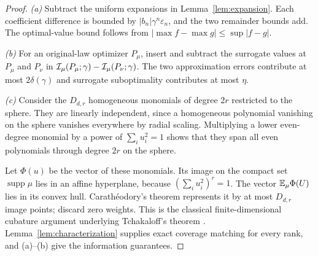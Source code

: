 \begin{proof}
\emph{(a)} Subtract the uniform expansions in Lemma~\ref{lem:expansion}. Each coefficient difference is bounded by $|b_n|\gamma^n\varepsilon_n$, and the two remainder bounds add. The optimal-value bound follows from $|\max f-\max g|\le\sup|f-g|$.

\emph{(b)} For an original-law optimizer $P_\mu$, insert and subtract the surrogate values at $P_\mu$ and $P_\nu$ in $\mathcal I_\mu(P_\mu;\gamma)-\mathcal I_\mu(P_\nu;\gamma)$. The two approximation errors contribute at most $2\delta(\gamma)$ and surrogate suboptimality contributes at most $\eta$.

\emph{(c)} Consider the $D_{d,r}$ homogeneous monomials of degree $2r$ restricted to the sphere. They are linearly independent, since a homogeneous polynomial vanishing on the sphere vanishes everywhere by radial scaling. Multiplying a lower even-degree monomial by a power of $\sum_i u_i^2=1$ shows that they span all even polynomials through degree $2r$ on the sphere.

Let $\Phi(u)$ be the vector of these monomials. Its image on the compact set $\operatorname{supp}\mu$ lies in an affine hyperplane, because $(\sum_i u_i^2)^r=1$. The vector $\mathbb E_\mu\Phi(U)$ lies in its convex hull. Carath\'eodory's theorem represents it by at most $D_{d,r}$ image points; discard zero weights. This is the classical finite-dimensional cubature argument underlying Tchakaloff's theorem \cite{bayer2006}. Lemma~\ref{lem:characterization} supplies exact coverage matching for every rank, and (a)--(b) give the information guarantees.
\end{proof}

